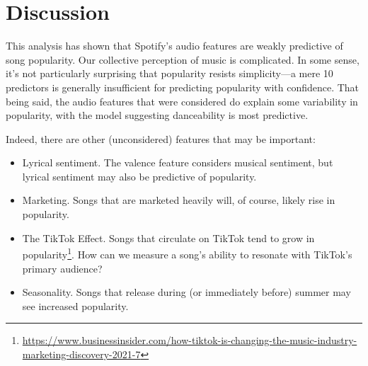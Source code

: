 \documentclass[12pt, twoside]{article}
\begin{document}
\section{Discussion}
This analysis has shown that Spotify's audio features are weakly predictive of song popularity. Our collective perception of music is complicated. In some sense, it's not particularly surprising that popularity resists simplicity---a mere 10 predictors is generally insufficient for predicting popularity with confidence. That being said, the audio features that were considered do explain some variability in popularity, with the model suggesting danceability is most predictive.  

Indeed, there are other (unconsidered) features that may be important: 
\begin{itemize}
  \item Lyrical sentiment. The valence feature considers musical sentiment, but lyrical sentiment  may also be predictive of popularity.
  \item Marketing. Songs that are marketed heavily will, of course, likely rise in popularity.
  \item The TikTok Effect. Songs that circulate on TikTok tend to grow in popularity\footnote{\href{https://www.businessinsider.com/how-tiktok-is-changing-the-music-industry-marketing-discovery-2021-7}{https://www.businessinsider.com/how-tiktok-is-changing-the-music-industry-marketing-discovery-2021-7}}. How can we measure a song's ability to resonate with TikTok's primary audience?
  \item Seasonality. Songs that release during (or immediately before) summer may see increased popularity.
\end{itemize}
\end{document}
